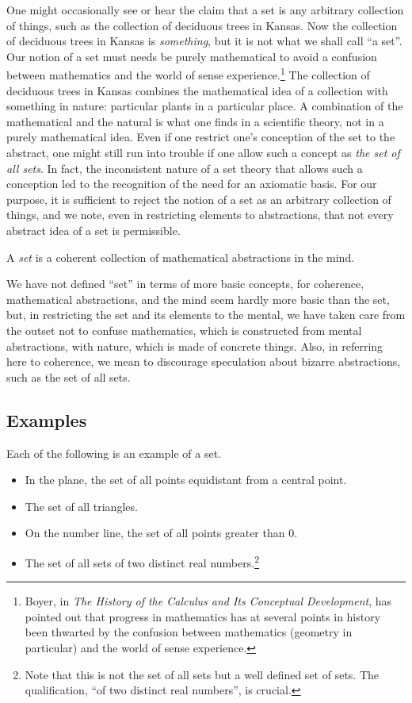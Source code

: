 One might occasionally see or hear the claim that a set is any arbitrary
collection of things, such as the collection of deciduous trees in Kansas. Now
the collection of deciduous trees in Kansas is \emph{something}, but it is not
what we shall call ``a set''. Our notion of a set must needs be purely
mathematical to avoid a confusion between mathematics and the world of sense
experience.\footnote{%
   Boyer, in {\it The History of the Calculus and Its Conceptual Development},
   has pointed out that progress in mathematics has at several points in
   history been thwarted by the confusion between mathematics (geometry in
   particular) and the world of sense experience.%
}
The collection of deciduous trees in Kansas combines the mathematical idea of a
collection with something in nature: particular plants in a particular place. A
combination of the mathematical and the natural is what one finds in a
scientific theory, not in a purely mathematical idea. Even if one restrict
one's conception of the set to the abstract, one might still run into trouble
if one allow such a concept as \emph{the set of all sets}. In fact, the
inconsistent nature of a set theory that allows such a conception led to the
recognition of the need for an axiomatic basis. For our purpose, it is
sufficient to reject the notion of a set as an arbitrary collection of things,
and we note, even in restricting elements to abstractions, that not every
abstract idea of a set is permissible.

\begin{definition}
   A \emph{set} is a coherent collection of mathematical abstractions in the
   mind.
\end{definition}

We have not defined ``set'' in terms of more basic concepts, for coherence,
mathematical abstractions, and the mind seem hardly more basic than the set,
but, in restricting the set and its elements to the mental, we have taken care
from the outset not to confuse mathematics, which is constructed from mental
abstractions, with nature, which is made of concrete things. Also, in referring
here to coherence, we mean to discourage speculation about bizarre
abstractions, such as the set of all sets.

\subsection{Examples}

Each of the following is an example of a set.
\begin{itemize}
   \item In the plane, the set of all points equidistant from a central point.
   \item The set of all triangles.
   \item On the number line, the set of all points greater than 0.
   \item The set of all sets of two distinct real numbers.\footnote{%
         Note that this is not the set of all sets but a well defined set of
         sets. The qualification, ``of two distinct real numbers'', is
         crucial.%
      }
\end{itemize}

